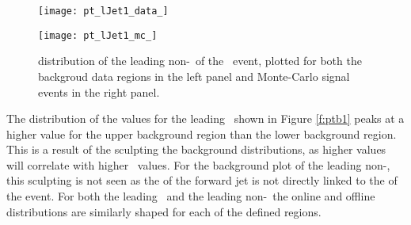         \begin{figure}[h]
            \centering

            \begin{minipage}[h]{0.48\linewidth}
                \texttt{[image: pt\_lJet1\_data\_]}
            \end{minipage}
            \quad
            \begin{minipage}[h]{0.48\linewidth}
                \texttt{[image: pt\_lJet1\_mc\_]}
            \end{minipage}
            \caption[\pt distribution of the leading non-\bjet\ of the \VBFHBB\ event]{\pt distribution of the leading non-\bjet\ of the \VBFHBB\ event, plotted for both the backgroud data regions in the left panel and Monte-Carlo signal events in the right panel.}
            \label{f:ptj1}
        \end{figure}

    The distribution of the \pt values for the leading \bjet\ shown in Figure \ref{f:ptb1} peaks at a higher value for the upper background region than the lower background region. This is a result of the \mbb sculpting the background distributions, as higher \mbb values will correlate with higher \bjet\ \pt values. For the background \pt plot of the leading non-\bjet, this sculpting is not seen as the \pt of the forward jet is not directly linked to the \mbb of the event. For both the leading \bjet\ and the leading non-\bjet\, the online and offline distributions are similarly shaped for each of the defined \mbb regions.

